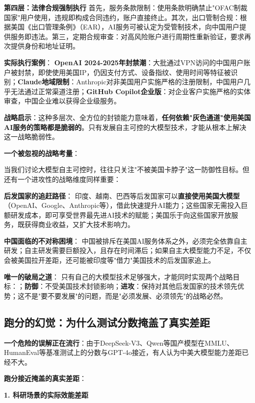 \textbf{第四层：法律合规强制执行}
首先，服务条款限制：使用条款明确禁止"OFAC\allowbreak 制裁国家"用户使用，违规即构成合同违约，账户直接终止。其次，出口管制合规：根据美国《出口管理条例》（EAR），AI服务可被认定为受管制技术，向中国用户提供服务即违法。第三，定期合规审查：对高风险账户进行周期性重新验证，要求再次提供身份和地址证明。

\textbf{实际执行案例}：
\textbf{OpenAI 2024-2025年封禁潮}：大批通过VPN访问的中国用户账户被封禁，即使使用美国IP，仍因支付方式、设备指纹、使用时间等特征被识别；\textbf{Claude地域限制}：Anthropic对非美国用户实施严格的注册限制，中国用户几乎无法通过正常渠道注册；\textbf{GitHub Copilot企业版}：对企业客户实施严格的实体审查，中国企业难以获得企业级服务。

\textbf{战略启示}：这种多层次、全方位的封锁能力意味着，\textbf{任何依赖"灰色通道"使用美国AI服务的策略都是脆弱的}。只有发展自主可控的大模型技术，才能从根本上解决这一战略脆弱性。

\textbf{一个被忽视的战略考量}：

当我们讨论大模型自主可控时，往往只关注"不被美国卡脖子"这一防御性目标。但还有一个进攻性的战略维度同样重要：

\textbf{后发国家的追赶路径}：
印度、越南、巴西等后发国家可以\textbf{直接使用美国大模型}（OpenAI、Google、Anthropic等），借此快速提升AI能力；这些国家无需投入巨额研发成本，即可享受世界最先进AI技术的赋能；美国乐于向这些国家开放服务，既获得商业收益，又扩大技术影响力。

\textbf{中国面临的不对称困境}：
中国被排斥在美国AI服务体系之外，必须完全依靠自主研发；自主研发需要巨额投入，且存在时间滞后；如果自主大模型能力不足，不仅会被美国拉开差距，还可能被印度等"借力"美国技术的后发国家追上。

\textbf{唯一的破局之道}：
只有自己的大模型技术足够强大，才能同时实现两个战略目标：；\textbf{防御}：不受美国技术封锁影响；\textbf{进攻}：保持对其他后发国家的技术领先优势；这不是"要不要发展"的问题，而是"必须发展、必须领先"的战略必然。

\subsection{跑分的幻觉：为什么测试分数掩盖了真实差距}

\textbf{一个危险的误解正在流行}：由于DeepSeek-V3、Qwen等国产模型在MMLU、HumanEval等基准测试上的分数与GPT-4o接近，有人认为中美大模型能力差距已经不大。

\textbf{跑分接近掩盖的真实差距}：

\textbf{1. 科研场景的实际效能差距}

